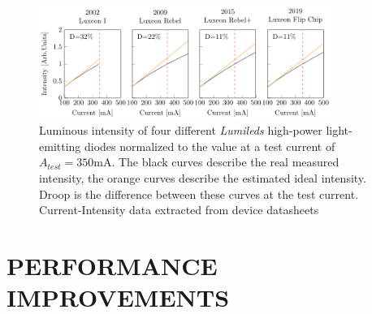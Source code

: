 \documentclass[a4paper,nocompress]{spie}  %
\begin{document}
\begin{figure} [ht]
    \begin{center}
        \includegraphics[width=0.85\textwidth]{SPIE/article/droop_lumileds.pdf}
    \end{center}
    \caption{Luminous intensity of four different \textit{Lumileds} high-power light-emitting diodes normalized to the value at a test current of $A_{test}=350$mA. The black curves describe the real measured intensity, the orange curves describe the estimated ideal intensity. Droop is the difference between these curves at the test current. Current-Intensity data extracted from device datasheets \cite{datasheet_lumileds_lux1,datasheet_lumileds_rebel,datasheet_lumileds_rebplus,lumi2019data}}
    \label{fig:chip_arch}
\end{figure}

\section{PERFORMANCE IMPROVEMENTS}
\end{document}

